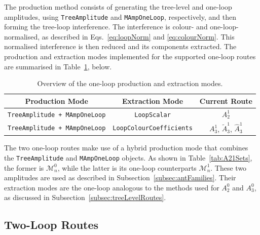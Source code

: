 The production method consists of generating the tree-level and one-loop amplitudes, using
\texttt{TreeAmplitude} and \texttt{MAmpOneLoop}, respectively, and then forming the tree-loop 
interference. The interference is colour- and one-loop-normalised, as described in Eqs.~\eqref{eq:loopNorm} and \eqref{eq:colourNorm}.
This normalised interference is then reduced and its components extracted.
The production and extraction modes implemented for the supported one-loop routes
are summarised in Table~\ref{tab:oneLoopProdModes}, below.

\begin{table}[h!]
\footnotesize
\centering
\caption{Overview of the one-loop production and extraction modes.}
\renewcommand{\arraystretch}{1.3}
  \begin{tabular}{|c|c|c|} 
   \hline
   \textbf{Production Mode} & \textbf{Extraction Mode} & \textbf{Current Route} \\ 
   \hline
   \texttt{TreeAmplitude + MAmpOneLoop} & \texttt{LoopScalar} & $A_2^1$ \\ \hline
   \texttt{TreeAmplitude + MAmpOneLoop} & \texttt{LoopColourCoefficients} & $A_3^1$, $\tilde A_3^1$, $\hat A_3^1$ \\ \hline
  \end{tabular}

\label{tab:oneLoopProdModes}
\end{table}

The two one-loop routes make use of a hybrid production mode that combines the \texttt{TreeAmplitude} and
\texttt{MAmpOneLoop} objects. As shown in Table~\ref{tab:A21Sets}, the former is $\mathcal M_n^0$, while the 
latter is its one-loop counterparts $\mathcal M_n^1$. These two amplitudes are used as described in 
Subsection~\ref{subsec:antFamilies}. Their extraction modes are the one-loop analogous to the methods 
used for $A_2^0$ and $A_3^0$, as discussed in Subsection~\ref{subsec:treeLevelRoutes}. 

\subsection{Two-Loop Routes}

